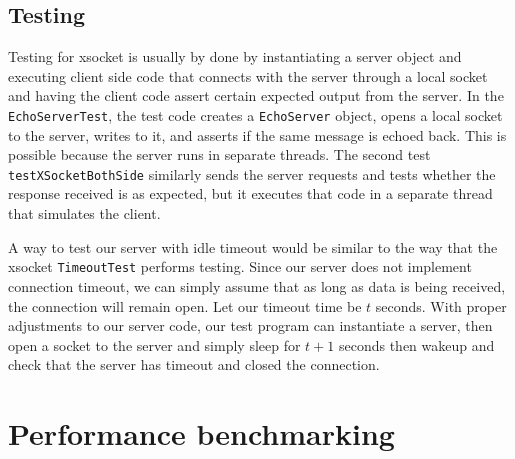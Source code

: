 \documentclass[letterpaper,12pt]{article}
\begin{document}
\subsection{Testing}

Testing for xsocket is usually by done by instantiating a server object and executing client side code that connects with the server through a local socket and having the client code assert certain expected output from the server. In the \texttt{EchoServerTest}, the test code creates a \texttt{EchoServer} object, opens a local socket to the server, writes to it, and asserts if the same message is echoed back. This is possible because the server runs in separate threads. The second test \texttt{testXSocketBothSide} similarly sends the server requests and tests whether the response received is as expected, but it executes that code in a separate thread that simulates the client.

A way to test our server with idle timeout would be similar to the way that the xsocket \texttt{TimeoutTest} performs testing. Since our server does not implement connection timeout, we can simply assume that as long as data is being received, the connection will remain open. Let our timeout time be $t$ seconds. With proper adjustments to our server code, our test program can instantiate a server, then open a socket to the server and simply sleep for $t + 1$ seconds then wakeup and check that the server has timeout and closed the connection.

\section{Performance benchmarking}
\end{document}
